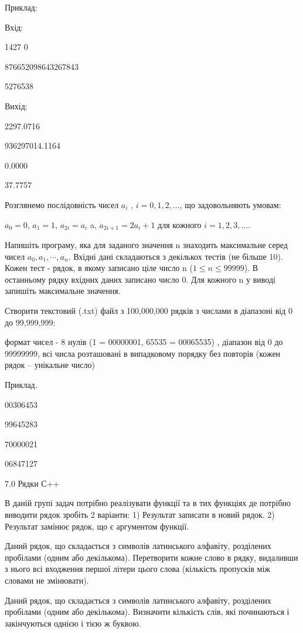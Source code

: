 \documentclass[]{article}
\begin{document}
Приклад:

Вхід:

1427 0

876652098643267843

5276538

Вихід:

2297.0716

936297014.1164

0.0000

37.7757

Розглянемо послідовність чисел
\(a_{i}\) , $i = 0, 1, 2, \ldots$, що задовольняють умовам:

\(a_{0} = 0\), \(a_{1} = 1\), \(a_{2i} = a_{i}\) a,
\(a_{2i + 1} = {2a}_{i} + 1\) для кожного $i = 1, 2, 3, \ldots $.

Напишіть програму, яка для заданого значення n знаходить максимальне
серед чисел \(a_{0},a_{1},\cdots,a_{n}\). Вхідні дані складаються з
декількох тестів (не більше 10). Кожен тест - рядок, в якому записано
ціле число n ($1 \le n \le 99 999$). В останньому рядку вхідних даних записано
число 0. Для кожного n у виводі запишіть максимальне значення.

Створити текстовий (.txt) файл з 100,000,000 рядків з числами в
діапазоні від 0 до 99,999,999:

формат чисел - 8 нулів (1 = 00000001, 65535 = 00065535) , діапазон від 0
до 99999999, всі числа розташовані в випадковому порядку без повторів
(кожен рядок -- унікальне число)

Приклад.

00306453

99645283

70000021

06847127

7.0 Рядки С++

\protect\hypertarget{_Hlk65949005}{}{}В даній групі задач потрібно
реалізувати функції та в тих функціях де потрібно виводити рядок зробіть
2 варіанти: 1) Результат записати в новий рядок. 2) Результат замінює
рядок, що є аргументом функції.

Даний рядок, що складається з символів латинського алфавіту, розділених
пробілами (одним або декількома). Перетворити кожне слово в рядку,
видаливши з нього всі входження першої літери цього слова (кількість
пропусків між словами не змінювати).

Даний рядок, що складається з символів латинського алфавіту, розділених
пробілами (одним або декількома). Визначити кількість слів, які
починаються і закінчуються однією і тією ж буквою.
\end{document}
